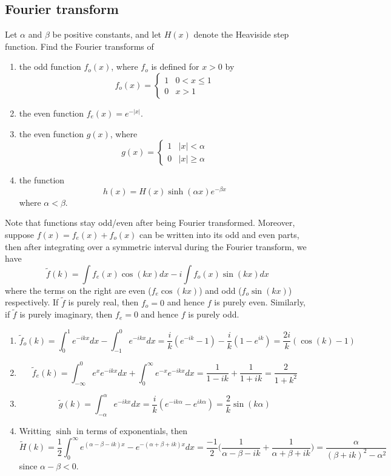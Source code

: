\documentclass[a4paper]{article}
\begin{document}
\subsection*{Fourier transform}
\begin{qns}
Let $\alpha$ and $\beta$ be positive constants, and let $H(x)$ denote the Heaviside step function. Find the Fourier transforms of 
\begin{enumerate}[label=(\alph*)]
    \item the odd function $f_o(x)$, where $f_o$ is defined for $x>0$ by 
    $$f_o(x)=
\left\{
        \begin{array}{ll}
      1 & 0< x\leq 1 \\
      0 & x>1 
        \end{array}
    \right.$$
    \item the even function $f_e(x)=e^{-|x|}$.
    \item the even function $g(x)$, where
    $$g(x)=
\left\{
        \begin{array}{ll}
      1 & |x|<\alpha \\
      0 & |x|\geq\alpha 
        \end{array}
    \right.$$
    \item the function
    $$h(x)=H(x)\sinh(\alpha x)e^{-\beta x}$$
    where $\alpha<\beta$.
\end{enumerate}
\end{qns}
\begin{ans}
Note that functions stay odd/even after being Fourier transformed. Moreover, suppose $f(x)=f_e(x)+f_o(x)$ can be written into its odd and even parts, then after integrating over a symmetric interval during the Fourier transform, we have
$$\tilde{f}(k)=\int f_e(x)\cos(kx)dx-i\int f_o(x)\sin(kx)dx$$
where the terms on the right are even ($f_e\cos(kx)$) and odd ($f_o\sin(kx)$) respectively. If $\tilde{f}$ is purely real, then $f_o=0$ and hence $f$ is purely even. Similarly, if $\tilde{f}$ is purely imaginary, then $f_e=0$ and hence $f$ is purely odd.
\begin{enumerate}[label=(\alph*)]
\item $$\tilde{f}_o(k)=\int_0^1e^{-ikx}dx-\int_{-1}^0e^{-ikx}dx=\frac{i}{k}(e^{-ik}-1)-\frac{i}{k}(1-e^{ik})=\frac{2i}{k}(\cos(k)-1)$$
\item 
$$\tilde{f}_e(k)=\int_{-\infty}^0e^xe^{-ikx}dx+\int_0^\infty e^{-x}e^{-ikx}dx=\frac{1}{1-ik}+\frac{1}{1+ik}=\frac{2}{1+k^2}$$
\item $$\tilde{g}(k)=\int_{-\alpha}^\alpha e^{-ikx}dx=\frac{i}{k}(e^{-ik\alpha}-e^{ik\alpha})=\frac{2}{k}\sin(k\alpha)$$
\item Writting $\sinh$ in terms of exponentials, then
$$\tilde{H}(k)=\frac{1}{2}\int_0^\infty e^{(\alpha-\beta-ik)x}-e^{-(\alpha+\beta+ik)x}dx=\frac{-1}{2}\bigg(\frac{1}{\alpha-\beta-ik}+\frac{1}{\alpha+\beta+ik}\bigg)=\frac{\alpha}{(\beta+ik)^2-\alpha^2}$$
since $\alpha-\beta<0$.
\end{enumerate}
\end{ans}
\end{document}
